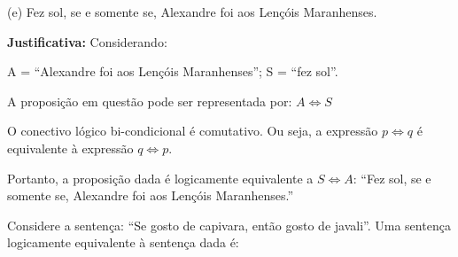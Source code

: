 \documentclass[12pt, a4paper, onecolumn]{exam}
\begin{document}
\begin{questions}

    \begin{solution}
        (e) Fez sol, se e somente se, Alexandre foi aos Lençóis Maranhenses.

        \textbf{Justificativa:} Considerando:

        A = “Alexandre foi aos Lençóis Maranhenses”; \hfill 
        S = “fez sol”.

        A proposição em questão pode ser representada por: \( A \iff S\)
        
        O conectivo lógico bi-condicional é comutativo. Ou seja, a expressão \( p \iff q \) é equivalente à expressão \( q \iff p \).
        
        Portanto, a proposição dada é logicamente equivalente a \( S \iff A \): “Fez sol, se e somente se, Alexandre foi aos Lençóis Maranhenses.”
        \end{solution}

    \question[q12] Considere a sentença: “Se gosto de capivara, então gosto de javali”. Uma sentença logicamente equivalente à sentença dada é: 
    
\end{questions}
\end{document}
